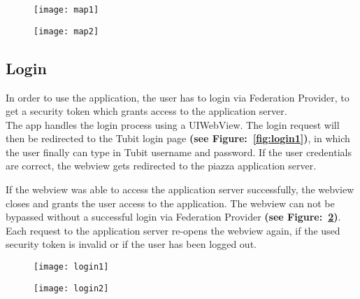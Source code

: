\begin{figure}
\centering
\begin{minipage}{.5\textwidth}
  \centering
  \texttt{[image: map1]}
  \label{fig:map1}
\end{minipage}%
\begin{minipage}{.5\textwidth}
  \centering
  \texttt{[image: map2]}
  \label{fig:map2}
\end{minipage}
\end{figure}


\subsection{Login}

In order to use the application, the user has to login via Federation Provider, to get
a security token which grants access to the application server. \\

The app handles the login process using a UIWebView. The login request will then be redirected
to the Tubit login page \textbf{(see Figure:~\ref{fig:login1})}, in which the user finally can type in Tubit username and password.
If the user credentials are correct, the webview gets redirected to the piazza application server.

If the webview was able to access the application server successfully, the webview closes and grants the user access to the application. The webview can not be bypassed without a successful login via Federation Provider \textbf{(see Figure:~\ref{fig:login2})}. Each request to the application server re-opens the webview again, if the used security token is invalid or if the user has been logged out.


\begin{figure}
\centering
\begin{minipage}{.5\textwidth}
  \centering
  \texttt{[image: login1]}
  \label{fig:login1}
\end{minipage}%
\begin{minipage}{.5\textwidth}
  \centering
  \texttt{[image: login2]}
  \label{fig:login2}
\end{minipage}
\end{figure}

